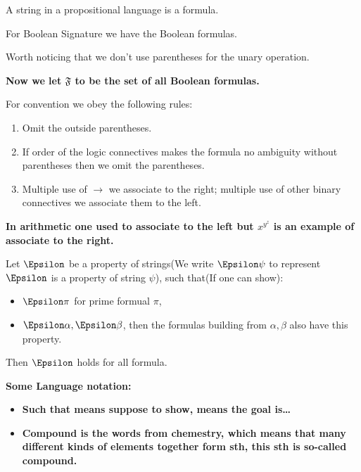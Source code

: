 \documentclass[11pt]{article}
\begin{document}
\begin{definition}[Formula]
A string in a propositional language is a formula.
\end{definition}

\begin{examplle}[ ]
For Boolean Signature we have the Boolean formulas.
\end{examplle}

Worth noticing that we don't use parentheses for the unary operation.

\textbf{Now we let \(\mathfrak{F}\) to be the set of all Boolean formulas.}

For convention we obey the following rules:
\begin{enumerate}
\item Omit the outside parentheses.
\item If order of the logic connectives makes the formula no ambiguity without parentheses then we omit the parentheses.
\item Multiple use of \(\rightarrow\) we associate to the right; multiple use of other binary connectives we associate them to the left.
\end{enumerate}

\textbf{In arithmetic one used to associate to the left but \(x^{y^z}\) is an example of associate to the right.}

\begin{theorem}
Let \(\Epsilon\) be a property of strings(We write \(\Epsilon\psi\) to represent \(\Epsilon\) is a property of string \(\psi\)), such that(If one can show):
\begin{itemize}
\item \(\Epsilon\pi\) for prime formual \(\pi\),
\item \(\Epsilon\alpha, \Epsilon\beta\), then the formulas building from \(\alpha, \beta\) also have this property.
\end{itemize}
Then \(\Epsilon\) holds for all formula.
\end{theorem}

\textbf{Some Language notation:}
\begin{itemize}
\item \textbf{Such that means suppose to show, means the goal is\ldots{}}

\item \textbf{Compound is the words from chemestry, which means that many different kinds of elements together form sth, this sth is so-called compound.}
\end{itemize}
\end{document}
